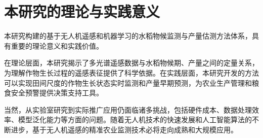 \section{本研究的理论与实践意义}
\label{sec:significance_revisit}

本研究构建的基于无人机遥感和机器学习的水稻物候监测与产量估测方法体系，具有重要的理论意义和实践价值。

在理论层面，本研究揭示了多光谱遥感数据与水稻物候期、产量之间的定量关系，为理解作物生长过程的遥感表征提供了科学依据。在实践层面，本研究开发的方法可以实现田间尺度的作物生长状态实时监测和产量早期预测，为农业生产管理和粮食安全预警提供决策支持工具。

当然，从实验室研究到实际推广应用仍面临诸多挑战，包括硬件成本、数据处理效率、模型泛化能力等方面的问题。随着无人机技术的快速发展和人工智能算法的不断进步，基于无人机遥感的精准农业监测技术必将走向成熟和大规模应用。
